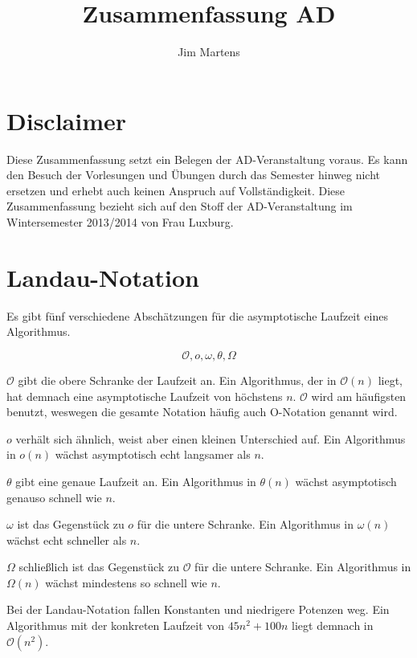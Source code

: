 \documentclass[10pt,a4paper,oneside,ngerman,numbers=noenddot]{scrartcl}
\begin{document}
\author{Jim Martens}
\title{Zusammenfassung AD}
\maketitle

\section*{Disclaimer}

	Diese Zusammenfassung setzt ein Belegen der AD-Veranstaltung voraus. Es kann den Besuch der Vorlesungen und Übungen durch das Semester hinweg nicht ersetzen und erhebt auch keinen Anspruch auf Vollständigkeit. Diese Zusammenfassung bezieht sich auf den Stoff der AD-Veranstaltung im Wintersemester 2013/2014 von Frau Luxburg.

\tableofcontents

\clearpage

\section{Landau-Notation}

	Es gibt fünf verschiedene Abschätzungen für die asymptotische Laufzeit eines Algorithmus.
	
	\[
		\mathcal{O}, o, \omega, \theta, \Omega
	\]
	
	$\mathcal{O}$ gibt die obere Schranke der Laufzeit an. Ein Algorithmus, der in $\mathcal{O}(n)$ liegt, hat demnach eine asymptotische Laufzeit von höchstens $n$. $\mathcal{O}$ wird am häufigsten benutzt, weswegen die gesamte Notation häufig auch O-Notation genannt wird.
	
	$o$ verhält sich ähnlich, weist aber einen kleinen Unterschied auf. Ein Algorithmus in $o(n)$ wächst asymptotisch echt langsamer als $n$.
	
	$\theta$ gibt eine genaue Laufzeit an. Ein Algorithmus in $\theta(n)$ wächst asymptotisch genauso schnell wie $n$.
	
	$\omega$ ist das Gegenstück zu $o$ für die untere Schranke. Ein Algorithmus in $\omega(n)$ wächst echt schneller als $n$.
	
	$\Omega$ schließlich ist das Gegenstück zu $\mathcal{O}$ für die untere Schranke. Ein Algorithmus in $\Omega(n)$ wächst mindestens so schnell wie $n$.
	
	Bei der Landau-Notation fallen Konstanten und niedrigere Potenzen weg. Ein Algorithmus mit der konkreten Laufzeit von $45n^{2} + 100n$ liegt demnach in $\mathcal{O}(n^{2})$.
	
\end{document}
